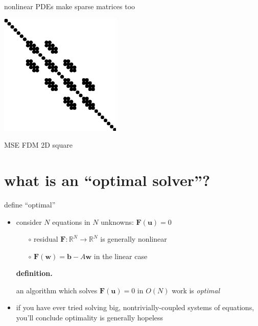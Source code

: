 \documentclass[hide notes,intlimits,usenames,dvipsnames]{beamer}
\newcommand{\RR}{\mathbb{R}}
\begin{document}
\begin{frame}{nonlinear PDEs make sparse matrices too}
\begin{itemize}
\begin{minipage}[t]{20mm}
\includegraphics[width=\textwidth]{figs/spybanded}

\tiny
 MSE FDM 2D square
\end{minipage}
\end{itemize}
\end{frame}


\section{what is an ``optimal solver''?}

\begin{frame}{define ``optimal''}
\begin{itemize}
\item consider $N$ equations in $N$ unknowns: \qquad $\mathbf{F}(\mathbf{u}) = 0$
	\begin{itemize}
	\item[$\circ$] residual $\mathbf{F}:\RR^N \to \RR^N$ is generally nonlinear
	\item[$\circ$] $\mathbf{F}(\mathbf{w}) = \mathbf{b} - A \mathbf{w}$ in the linear case
	\end{itemize}

\bigskip\medskip
\noindent \textbf{definition.}  \begin{minipage}[t]{80mm}
an algorithm which solves $\mathbf{F}(\mathbf{u}) = 0$ in $O(N)$ work is \alert{\emph{optimal}}
\end{minipage}

\bigskip \bigskip
\item if you have ever tried solving big, nontrivially-coupled systems of equations, you'll conclude optimality is generally hopeless
\end{itemize}
\end{frame}
\end{document}
